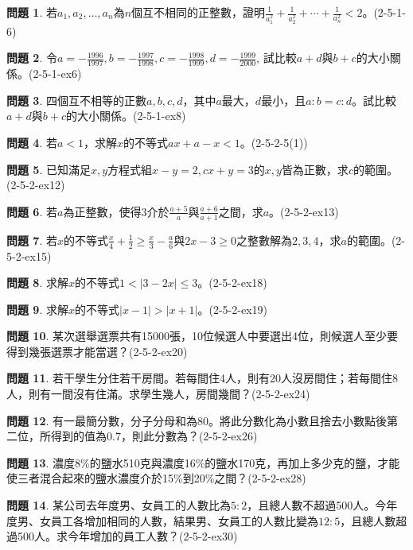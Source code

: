 \documentclass[12pt,a4paper]{article}
\theoremstyle{definition}
\newtheorem{prob}{問題}
\newcommand\prb[1]{\begin{prob}#1\end{prob}}
\begin{document}
\prb{若$a_1,a_2,\dots,a_n$為$n$個互不相同的正整數，證明$\frac{1}{a_1^2} + \frac{1}{a_2^2} + \cdots + \frac{1}{a_n^2}<2$。(2-5-1-6)}
\prb{令$a=-\frac{1996}{1997},b=-\frac{1997}{1998},c=-\frac{1998}{1999},d=-\frac{1999}{2000}$, 試比較$a+d$與$b+c$的大小關係。(2-5-1-ex6)}
\prb{四個互不相等的正數$a,b,c,d$，其中$a$最大，$d$最小，且$a:b=c:d$。試比較$a+d$與$b+c$的大小關係。(2-5-1-ex8)}
\prb{若$a<1$，求解$x$的不等式$ax+a-x < 1$。(2-5-2-5(1))}
\prb{已知滿足$x,y$方程式組$x-y=2, cx+y=3$的$x,y$皆為正數，求$c$的範圍。(2-5-2-ex12)}
\prb{若$a$為正整數，使得$3$介於$\frac{a+5}{a}$與$\frac{a+6}{a+1}$之間，求$a$。(2-5-2-ex13)}
\prb{若$x$的不等式$\frac{x}{4}+\frac{1}{2}\geqslant\frac{x}{3}-\frac{a}{6}$與$2x-3\geqslant 0$之整數解為$2,3,4$，求$a$的範圍。(2-5-2-ex15)}
\prb{求解$x$的不等式$1 < |3-2x| \leqslant 3$。(2-5-2-ex18)}
\prb{求解$x$的不等式$|x-1|>|x+1|$。(2-5-2-ex19)}
\prb{某次選舉選票共有15000張，10位候選人中要選出4位，則候選人至少要得到幾張選票才能當選？(2-5-2-ex20)}
\prb{若干學生分住若干房間。若每間住4人，則有20人沒房間住；若每間住8人，則有一間沒有住滿。求學生幾人，房間幾間？(2-5-2-ex24)}
\prb{有一最簡分數，分子分母和為80。將此分數化為小數且捨去小數點後第二位，所得到的值為$0.7$，則此分數為？(2-5-2-ex26)}
\prb{濃度8\%的鹽水510克與濃度16\%的鹽水170克，再加上多少克的鹽，才能使三者混合起來的鹽水濃度介於15\%到20\%之間？(2-5-2-ex28)}
\prb{某公司去年度男、女員工的人數比為$5:2$，且總人數不超過500人。今年度男、女員工各增加相同的人數，結果男、女員工的人數比變為$12:5$，且總人數超過500人。求今年增加的員工人數？(2-5-2-ex30)}
\end{document}
